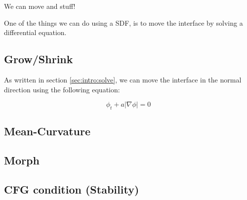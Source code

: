 
We can move and stuff!

One of the things we can do using a SDF, is to move the interface by
solving a differential equation.


\subsection{Grow/Shrink}


As written in section \vref{sec:intro:solve}, we can move the
interface in the normal direction using the following equation:

\begin{equation}
  \phi_t + a|\nabla\phi| = 0
\end{equation}


\subsection{Mean-Curvature}

\subsection{Morph}

\subsection{CFG condition (Stability)}



